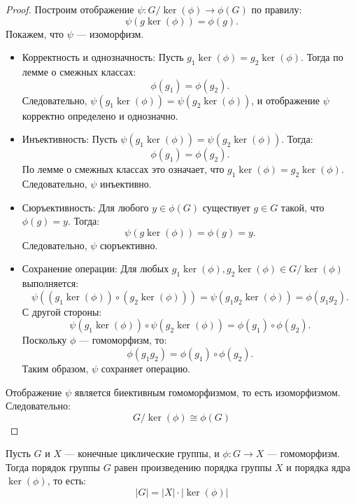 \begin{proof}
    Построим отображение \( \psi: G / \ker(\phi) \to \phi(G) \) по правилу:
    \[
    \psi(g \ker(\phi)) = \phi(g).
    \]
    Покажем, что \( \psi \) — изоморфизм.

    \begin{itemize}
        \item Корректность и однозначность:
              Пусть \( g_1 \ker(\phi) = g_2 \ker(\phi) \). Тогда по лемме о смежных классах:
              \[
              \phi(g_1) = \phi(g_2).
              \]
              Следовательно, \( \psi(g_1 \ker(\phi)) = \psi(g_2 \ker(\phi)) \), и отображение \( \psi \) корректно определено и однозначно.

        \item Инъективность:
              Пусть \( \psi(g_1 \ker(\phi)) = \psi(g_2 \ker(\phi)) \). Тогда:
              \[
              \phi(g_1) = \phi(g_2).
              \]
              По лемме о смежных классах это означает, что \( g_1 \ker(\phi) = g_2 \ker(\phi) \). Следовательно, \( \psi \) инъективно.

        \item Сюръективность:
              Для любого \( y \in \phi(G) \) существует \( g \in G \) такой, что \( \phi(g) = y \). Тогда:
              \[
              \psi(g \ker(\phi)) = \phi(g) = y.
              \]
              Следовательно, \( \psi \) сюръективно.

        \item Сохранение операции:
              Для любых \( g_1 \ker(\phi), g_2 \ker(\phi) \in G / \ker(\phi) \) выполняется:
              \[
              \psi((g_1 \ker(\phi)) \circ (g_2 \ker(\phi))) = \psi(g_1 g_2 \ker(\phi)) = \phi(g_1 g_2).
              \]
              С другой стороны:
              \[
              \psi(g_1 \ker(\phi)) \circ \psi(g_2 \ker(\phi)) = \phi(g_1) \circ \phi(g_2).
              \]
              Поскольку \( \phi \) — гомоморфизм, то:
              \[
              \phi(g_1 g_2) = \phi(g_1) \circ \phi(g_2).
              \]
              Таким образом, \( \psi \) сохраняет операцию.
    \end{itemize}

    Отображение \( \psi \) является биективным гомоморфизмом, то есть изоморфизмом. Следовательно:
    \[
    G / \ker(\phi) \cong \phi(G)
    \]
\end{proof}

\begin{shth}
    \begin{theorem}
        Пусть \( G \) и \( X \) — конечные циклические группы, и \( \phi: G \to X \) — гомоморфизм. Тогда порядок группы \( G \) равен произведению порядка группы \( X \) и порядка ядра \( \ker(\phi) \), то есть:
        \[
        |G| = |X| \cdot |\ker(\phi)|
        \]
    \end{theorem}
\end{shth}

